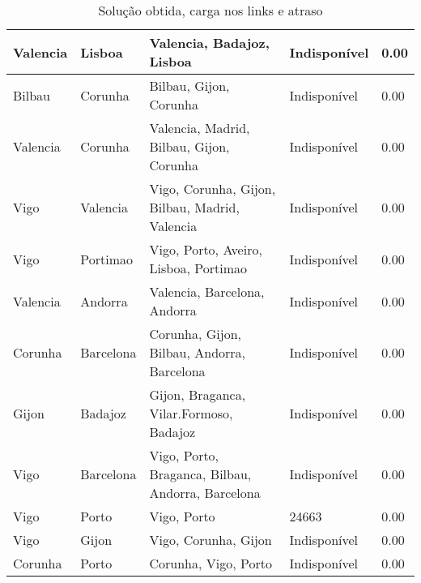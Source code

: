 \begin{table}[!htb]
{\begin{tabular}{|l|l|l|l|l|}
Valencia & Lisboa & Valencia, Badajoz, Lisboa & Indisponível & 0.00 \\ \hline
Bilbau & Corunha & Bilbau, Gijon, Corunha & Indisponível & 0.00 \\ \hline
Valencia & Corunha & Valencia, Madrid, Bilbau, Gijon, Corunha & Indisponível & 0.00 \\ \hline
Vigo & Valencia & Vigo, Corunha, Gijon, Bilbau, Madrid, Valencia & Indisponível & 0.00 \\ \hline
Vigo & Portimao & Vigo, Porto, Aveiro, Lisboa, Portimao & Indisponível & 0.00 \\ \hline
Valencia & Andorra & Valencia, Barcelona, Andorra & Indisponível & 0.00 \\ \hline
Corunha & Barcelona & Corunha, Gijon, Bilbau, Andorra, Barcelona & Indisponível & 0.00 \\ \hline
Gijon & Badajoz & Gijon, Braganca, Vilar.Formoso, Badajoz & Indisponível & 0.00 \\ \hline
Vigo & Barcelona & Vigo, Porto, Braganca, Bilbau, Andorra, Barcelona & Indisponível & 0.00 \\ \hline
Vigo & Porto & Vigo, Porto & 24663 & 0.00 \\ \hline
Vigo & Gijon & Vigo, Corunha, Gijon & Indisponível & 0.00 \\ \hline
Corunha & Porto & Corunha, Vigo, Porto & Indisponível & 0.00 \\ \hline
\end{tabular}}
\caption[]{Solução obtida, carga nos links e atraso}
\end{table}

